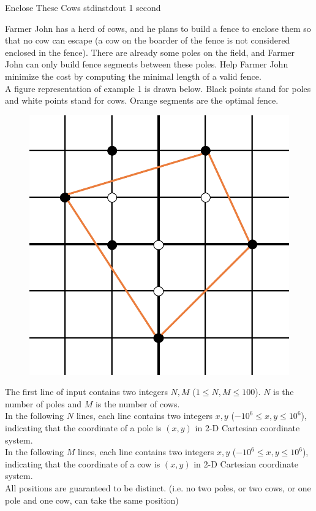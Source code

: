 \begin{problem}{Enclose These Cows}
{stdin}{stdout}
{1 second}{}{}

Farmer John has a herd of cows, and he plans to build a fence to enclose them so that no cow can escape (a cow on the boarder of the fence is not considered enclosed in the fence). There are already some poles on the field, and Farmer John can only build fence segments between these poles. Help Farmer John minimize the cost by computing the minimal length of a valid fence. \\
A figure representation of example 1 is drawn below. Black points stand for poles and white points stand for cows. Orange segments are the optimal fence. 
\begin{figure}[!h]
	\centering
	\includegraphics[scale=0.4]{sample1.png}
\end{figure}

\InputFile

The first line of input contains two integers $N, M$ ($1 \le N, M \le 100$). $N$ is the number of poles and $M$ is the number of cows. \\
In the following $N$ lines, each line contains two integers $x, y$ ($-10^6 \le x, y \le 10^6$), indicating that the coordinate of a pole is $(x, y)$ in 2-D Cartesian coordinate system. \\
In the following $M$ lines, each line contains two integers $x, y$ ($-10^6 \le x, y \le 10^6$), indicating that the coordinate of a cow is $(x, y)$ in 2-D Cartesian coordinate system. \\
All positions are guaranteed to be distinct. (i.e. no two poles, or two cows, or one pole and one cow, can take the same position)


\end{problem}
